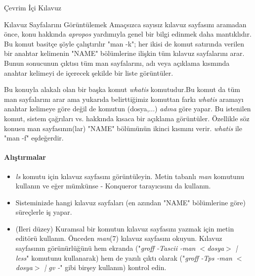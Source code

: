 \begin{section}{Çevrim İçi Kılavuz}
\begin{subsection}{Kılavuz Sayfalarını Görüntülemek}
Amaçsızca sayısız kılavuz sayfasını aramadan önce, konu hakkında \emph{apropos} yardımıyla genel bir bilgi edinmek daha mantıklıdır. Bu komut basitçe şöyle çalıştırılır "man -k"; her ikisi de komut satırında verilen bir anahtar kelimenin "NAME" bölümlerine ilişkin tüm kılavuz sayfalarını arar. Bunun sonucunun çıktısı tüm man sayfalarını, adı veya açıklama kısmında anahtar kelimeyi de içerecek şekilde bir liste görüntüler.

Bu konuyla alakalı olan bir başka komut \emph{whatis} komutudur.Bu komut da tüm man sayfalarını arar ama yukarıda belirttiğimiz komuttan farkı \emph{whatis} aramayı anahtar kelimeye göre değil de komutun (dosya,...) \emph{adına} göre yapar. Bu istenilen komut, sistem çağrıları vs. hakkında kısaca bir açıklama görüntüler. Özellikle söz konusu man sayfasının(lar) "NAME" bölümünün ikinci  kısmını verir. \emph{whatis} ile "man -f" eşdeğerdir.
\paragraph{Alıştırmalar}{
\begin{itemize}
 \item \emph{ls} komutu için kılavuz sayfasını görüntüleyin. Metin tabanlı \emph{man} komutunu kullanın ve eğer mümkünse - Konqueror tarayıcısını da kullanın.
 \item Sisteminizde hangi kılavuz sayfaları (en azından "NAME" bölümlerine göre) süreçlerle iş yapar.
 \item (Ileri düzey) Kuramsal bir komutun kılavuz sayfasını yazmak için metin editörü kullanın. Önceden \emph{man}(7) kılavuz sayfasını okuyun. Kılavuz sayfasının görünürlüğünü hem ekranda ("\emph{groff -Tascii -man $<$dosya$>$ | less}" komutunu kullanarak) hem de yazılı çıktı olarak ("\emph{groff -Tps -man $<$dosya$>$ | gv -}" gibi birşey kullanın) kontrol edin.
\end{itemize}}
\end{subsection}
\end{section}
